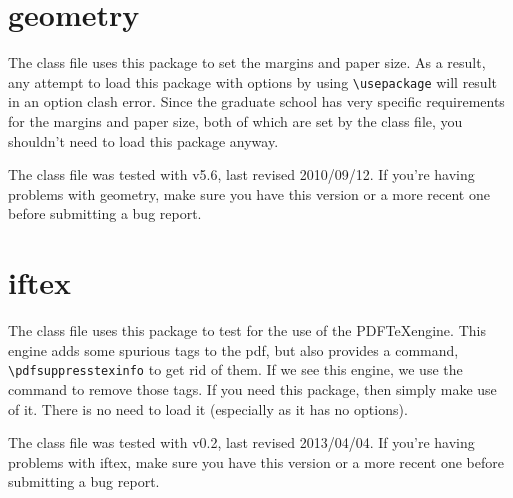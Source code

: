 \section{geometry}
The class file uses this package to set the margins and paper size.  As a result, any attempt to load this package with options by using \verb=\usepackage= will result in an option clash error.  Since the graduate school has very specific requirements for the margins and paper size, both of which are set by the class file, you shouldn't need to load this package anyway.

The class file was tested with v5.6, last revised 2010/09/12.  If you're having problems with geometry, make sure you have this version or a more recent one before submitting a bug report.

\section{iftex}
The class file uses this package to test for the use of the PDF\TeX engine.  This engine adds some spurious tags to the pdf, but also provides a command, \verb=\pdfsuppresstexinfo= to get rid of them.  If we see this engine, we use the command to remove those tags.  If you need this package, then simply make use of it.  There is no need to load it (especially as it has no options).

The class file was tested with v0.2, last revised 2013/04/04.  If you're having problems with iftex, make sure you have this version or a more recent one before submitting a bug report.

\endinput